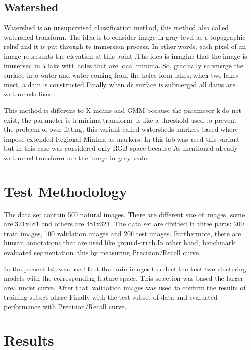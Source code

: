 \documentclass[10pt,twocolumn,letterpaper]{article}
\begin{document}
\subsection{Watershed}


Watershed is an unsupervised classification method, this method also called watershed transform. The idea is to consider image in gray level as a topographic relief and it is put through to immersion process. In other words, each pixel of an image represents the elevation at this point \cite{Bicego}.The idea is imagine that the image is immersed in a lake with holes that are local minima. So, gradually submerge the surface into water and water coming from the holes form lakes; when two lakes meet, a dam is constructed.Finally when de surface is submerged all dams are watersheds lines \cite{ArbelaezP}. 


This method is different to K-means and GMM because the parameter k do not exist, the parameter is h-minima transform, is like a threshold used to prevent the problem of over-fitting, this variant called watersheds markers-based where impose extended Regional Minima as markers. In this lab was used this variant but in this case was considered only RGB space because As mentioned already watershed transform use the image in gray scale. 


\section{Test Methodology}

The data set contain 500 natural images. There are different size of images, some are 321x481 and others are 481x321. The data set are divided in three parts: 200 train images, 100 validation images and 200 test images. Furthermore, there are human annotations that are used like ground-truth.In other hand, benchmark evaluated segmentation, this by measuring Precision/Recall curve.  

In the present lab was used first the train images to select the best two clustering models with the corresponding feature space. This selection was based the larger area under curve. After that, validation images was used to confirm the results of training subset phase Finally with the test subset of data and evaluated performance with Precision/Recall curve. 



\section{Results}
\end{document}
